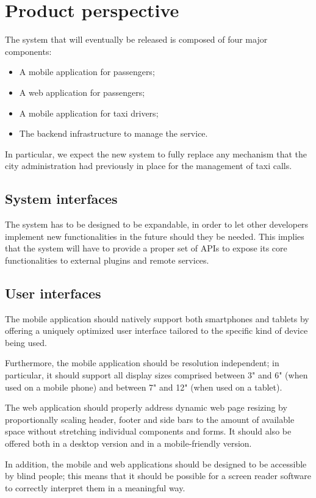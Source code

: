 \section{Product perspective}
The system that will eventually be released is composed of four major components:
\begin{itemize}
\item A mobile application for passengers;
\item A web application for passengers;
\item A mobile application for taxi drivers;
\item The backend infrastructure to manage the service.
\end{itemize}
In particular, we expect the new system to fully replace any mechanism that the city administration had previously in place for the management of taxi calls.


\subsection{System interfaces}
The system has to be designed to be expandable, in order to let other developers implement new functionalities in the future should they be needed. This implies that the system will have to provide a proper set of APIs to expose its core functionalities to external plugins and remote services. 


\subsection{User interfaces}
The mobile application should natively support both smartphones and tablets by offering a uniquely optimized user interface tailored to the specific kind of device being used. 

Furthermore, the mobile application should be resolution independent; in particular, it should support all display sizes comprised between 3" and 6" (when used on a mobile phone) and between 7" and 12" (when used on a tablet).

The web application should properly address dynamic web page resizing by proportionally scaling header, footer and side bars to the amount of available space without stretching individual components and forms. It should also be offered both in a desktop version and in a mobile-friendly version.

In addition, the mobile and web applications should be designed to be accessible by blind people; this means that it should be possible for a screen reader software to correctly interpret them in a meaningful way.


